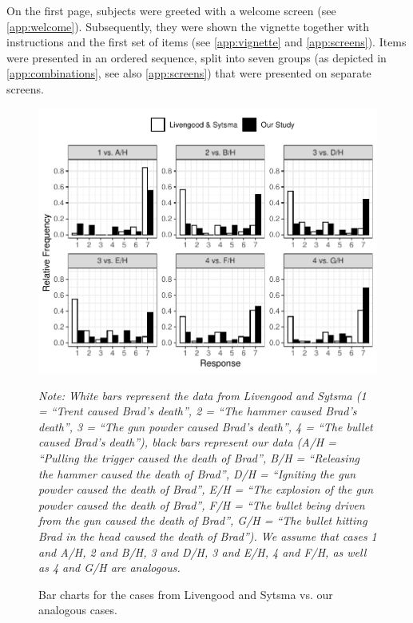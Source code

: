 \documentclass[12pt]{scrartcl}
\begin{document}
On the first page, subjects were greeted with a welcome screen (see \autoref{app:welcome}). Subsequently, they were shown the vignette together with instructions and the first set of items (see \autoref{app:vignette} and \ref{app:screens}). Items were presented in an ordered sequence, split into seven groups (as depicted in \autoref{app:combinations}, see also \autoref{app:screens}) that were presented on separate screens.

\begin{figure}[th!]
   \centering
   \includegraphics[width=\textwidth]{comparison.pdf}
   \begin{minipage}{\linewidth}
      \emph{Note: White bars represent the data from Livengood and Sytsma (1 = \enquote{Trent caused Brad's death}, 2 = \enquote{The hammer caused Brad's death}, 3 = \enquote{The gun powder caused Brad's death}, 4 = \enquote{The bullet caused Brad's death}), black bars represent our data (A/H = \enquote{Pulling the trigger caused the death of Brad}, B/H = \enquote{Releasing the hammer caused the death of Brad}, D/H = \enquote{Igniting the gun powder caused the death of Brad}, E/H = \enquote{The explosion of the gun powder caused the death of Brad}, F/H = \enquote{The bullet being driven from the gun caused the death of Brad}, G/H = \enquote{The bullet hitting Brad in the head caused the death of Brad}). We assume that cases 1 and A/H, 2 and B/H, 3 and D/H, 3 and E/H, 4 and F/H, as well as 4 and G/H are analogous.}
   \end{minipage}
   \caption{Bar charts for the cases from Livengood and Sytsma vs. our analogous cases.}
   \label{fig:plot}
\end{figure}
\end{document}
